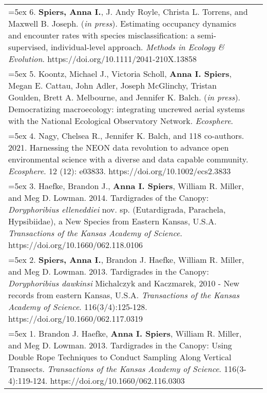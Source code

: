 \begin{longtable}{@{} >{\raggedright}p{6.10in} >{\raggedleft}X @{}}

\hangindent=5ex 6. \textbf{Spiers, Anna I.}, J. Andy Royle, Christa L. Torrens, and Maxwell B. Joseph. (\emph{in press}). Estimating occupancy dynamics and encounter rates with species misclassification: a semi-supervised, individual-level approach. \emph{Methods in Ecology \& Evolution}. https://doi.org/10.1111/2041-210X.13858  &  \tabularnewline

\hangindent=5ex 5. Koontz, Michael J., Victoria Scholl, \textbf{Anna I. Spiers}, Megan E. Cattau, John Adler, Joseph McGlinchy, Tristan Goulden, Brett A. Melbourne, and Jennifer K. Balch. (\emph{in press}). Democratizing macroecology: integrating uncrewed aerial systems with the National Ecological Observatory Network. \emph{Ecosphere}.  &  \tabularnewline

\hangindent=5ex 4. Nagy, Chelsea R., Jennifer K. Balch, and 118 co-authors. 2021. Harnessing the NEON data revolution to advance open environmental science with a diverse and data capable community. \emph{Ecosphere}. 12 (12): e03833. https://doi.org/10.1002/ecs2.3833  &  \tabularnewline

\hangindent=5ex 3. Haefke, Brandon J., \textbf{Anna I. Spiers}, William R. Miller, and Meg D. Lowman. 2014. Tardigrades of the Canopy: \emph{Doryphoribius elleneddiei} nov. sp. (Eutardigrada, Parachela, Hypsibiidae), a New Species from Eastern Kansas, U.S.A. \emph{Transactions of the Kansas Academy of Science}. https://doi.org/10.1660/062.118.0106  &  \tabularnewline

\hangindent=5ex 2. \textbf{Spiers, Anna I.}, Brandon J. Haefke, William R. Miller, and Meg D. Lowman. 2013. Tardigrades in the Canopy: \emph{Doryphoribius dawkinsi} Michalczyk and Kaczmarek, 2010 - New records from eastern Kansas, U.S.A. \emph{Transactions of the Kansas Academy of Science}. 116(3/4):125-128. https://doi.org/10.1660/062.117.0319  &  \tabularnewline

\hangindent=5ex 1. Brandon J. Haefke, \textbf{Anna I. Spiers}, William R. Miller, and Meg D. Lowman. 2013. Tardigrades in the Canopy: Using Double Rope Techniques to Conduct Sampling Along Vertical Transects. \emph{Transactions of the Kansas Academy of Science}. 116(3-4):119-124. https://doi.org/10.1660/062.116.0303  &  \tabularnewline

\end{longtable}
